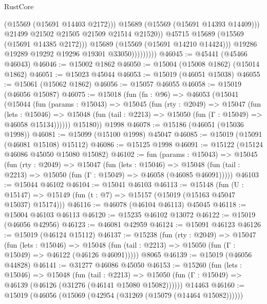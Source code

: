\begin{lexlean}{RustCore}
\begin{coremodule}
                                  (@15569 (@15691 @14403 @2172)))
                                @15689
                                (@15569 (@15691 @14393 @14409)))
                              @21499
                              @21502
                              @21505
                              @21509
                              @21514
                              @21520))
                          @45715
                          @15689
                          (@15569 (@15691 @14385 @2172)))
                        @15689
                        (@15569 (@15691 @14210 @14424)))
                      @19286
                      @19289
                      @19292
                      @19296
                      @19301
                      @33050)))))))))
@46045 := @45441 (@45466 @46043)
@46046 := @15002 @1862
@46050 := @15004 (@15008 @1862) (@15014 @1862)
@46051 := @15023 @45044
@46053 := @15019 (@46051 @15038)
@46055 := @15061 (@15062 @1862)
@46056 := @15057 @46055
@46058 := @15019 (@46056 @15087)
@46075 := @15018
    (fun (fn : @96) =>
    @46053
      (@15041
        (@15044
          (fun (params : @15043) =>
          @15045
            (fun (rty : @2049) =>
            @15047
              (fun (lets : @15046) =>
              @15048 (fun (tail : @2213) => @15050 (fun (Γ : @15049) => @46058 @15134))))))
        @15180))
    @1998
@46078 := @15186 (@46051 (@15036 @1998))
@46081 := @15099 (@15100 @1998) @45047
@46085 := @15019 (@15091 (@46081 @15108) @15112)
@46086 := @15125 @1998
@46091 := @15122 (@15124 @46086 @45050 @15080 @15082)
@46102 := fun (params : @15043) =>
  @15045
    (fun (rty : @2049) =>
    @15047
      (fun (lets : @15046) =>
      @15048 (fun (tail : @2213) => @15050 (fun (Γ : @15049) => @46058 (@46085 @46091)))))
@46103 := @15044 @46102
@46104 := @15041 @46103
@46113 := @15148
    (fun (U : @15147) => @15149 (fun (t : @7) => @15157 (@15019 (@15163 @45047 @15037) @15174)))
@46116 := @46078 (@46104 @46113) @45045
@46118 := @15004 @46103 @46113
@46120 := @15235 @46102 @13072
@46122 := @15019 (@46056 @42956)
@46123 := @46081 @42959
@46124 := @15091 @46123
@46126 := @15019 (@46124 @15112)
@46137 := @15238
    (fun (rty : @2049) =>
    @15047
      (fun (lets : @15046) =>
      @15048 (fun (tail : @2213) => @15050 (fun (Γ : @15049) => @46122 (@46126 @46091)))))
    @8065
@46139 := @15019 (@46056 @44828)
@46141 := @31277 @46086 @45050
@46153 := @15260
    (fun (lets : @15046) =>
    @15048
      (fun (tail : @2213) =>
      @15050 (fun (Γ : @15049) => @46139 (@46126 (@31276 (@46141 @15080 @15082))))))
    @14463
@46160 := @15019 (@46056 (@15069 (@42954 (@31269 (@15079 (@14464 @15082))))))

\end{coremodule}
\end{lexlean}
